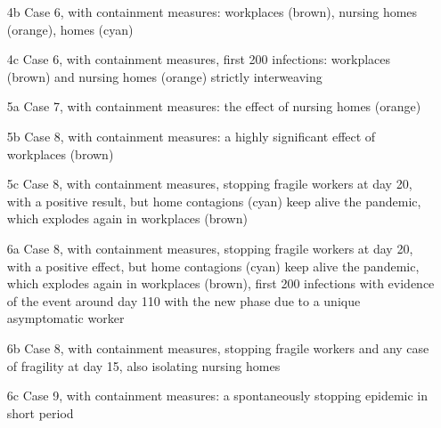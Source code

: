 \documentclass[graybox]{svmult}
\begin{document}
\begin{itemize}
\item [4b] Case 6, with containment measures: workplaces (brown), nursing homes (orange), homes (cyan)
\item [4c] Case 6, with containment measures, first 200 infections: workplaces (brown) and nursing homes (orange) strictly interweaving
\item [5a] Case 7, with containment measures: the effect of nursing homes (orange)
\item [5b] Case 8, with containment measures: a highly significant effect of workplaces (brown)
\item [5c] Case 8, with containment measures, stopping fragile workers at day 20, with a positive result, but home contagions (cyan) keep alive the pandemic, which explodes again in workplaces (brown)
\item [6a] Case 8, with containment measures, stopping fragile workers at day 20, with a positive effect, but home contagions (cyan) keep alive the pandemic, which explodes again in workplaces (brown), first 200 infections with evidence of the event around day 110 with the new phase due to a unique asymptomatic worker
\item [6b] Case 8, with containment measures, stopping fragile workers and any case of fragility at day 15, also isolating nursing homes
\item [6c] Case 9, with containment measures: a spontaneously stopping epidemic in short period
\end{itemize}






\end{document}
